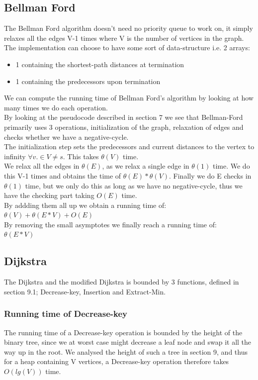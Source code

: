 \documentclass[11pt]{article}
\begin{document}
\subsection{Bellman Ford}
The Bellman Ford algorithm doesn't need no priority queue to work on, it simply relaxes all the edges V-1 times where V is the number of vertices in the graph. The implementation can choose to have some sort of data-structure i.e. 2 arrays:
\begin{itemize}
\item 1 containing the shortest-path distances at termination
\item 1 containing the predecessors upon termination
\end{itemize}
We can compute the running time of Bellman Ford's algorithm by looking at how many times we do each operation.\\
By looking at the pseudocode described in section 7 we see that Bellman-Ford primarily uses 3 operations, initialization of the graph, relaxation of edges and checks whether we have a negative-cycle.\\
The initialization step sets the predecessors and current distances to the vertex to infinity $\forall v. \in V \neq s$. This takes $\theta(V)$ time.\\ We relax all the edges in $\theta(E)$, as we relax a single edge in $\theta(1)$ time. We do this V-1 times and obtains the time of $\theta(E) * \theta(V)$. Finally we do E checks in $\theta(1)$ time, but we only do this as long as we have no negative-cycle, thus we have the checking part taking $O(E)$ time.\\
By addding them all up we obtain a running time of:\\
$\theta(V) + \theta(E*V) + O(E)$\\
By removing the small asymptotes we finally reach a running time of:\\
$\theta(E*V)$
\newpage
\subsection{Dijkstra}
The Dijkstra and the modified Dijkstra is bounded by 3 functions, defined in section 9.1; Decrease-key, Insertion and Extract-Min.
\subsubsection{Running time of Decrease-key}
The running time of a Decrease-key operation is bounded by the height of the binary tree, since we at worst case might decrease a leaf node and swap it all the way up in the root. We analysed the height of such a tree in section 9, and thus for a heap containing V vertices, a Decrease-key operation therefore takes $O(lg(V))$ time. 
\end{document}
